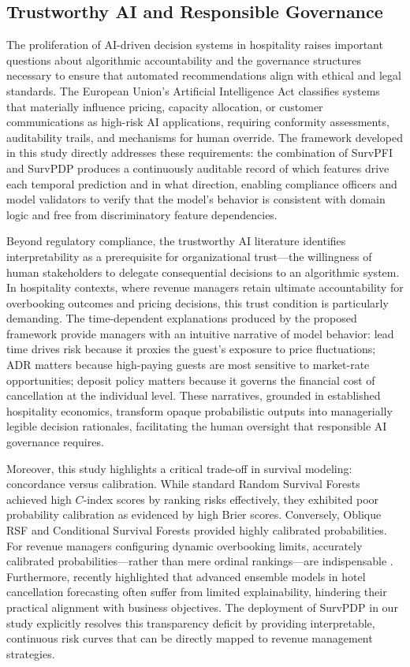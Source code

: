 \documentclass[pdflatex,sn-mathphys-ay]{sn-jnl}
\theoremstyle{thmstyleone}%
\theoremstyle{thmstyletwo}%
\theoremstyle{thmstylethree}%
\begin{document}
\subsection{Trustworthy AI and Responsible Governance}

The proliferation of AI-driven decision systems in hospitality raises important questions about algorithmic accountability and the governance structures necessary to ensure that automated recommendations align with ethical and legal standards. The European Union's Artificial Intelligence Act classifies systems that materially influence pricing, capacity allocation, or customer communications as high-risk AI applications, requiring conformity assessments, auditability trails, and mechanisms for human override. The framework developed in this study directly addresses these requirements: the combination of SurvPFI and SurvPDP produces a continuously auditable record of which features drive each temporal prediction and in what direction, enabling compliance officers and model validators to verify that the model's behavior is consistent with domain logic and free from discriminatory feature dependencies.

Beyond regulatory compliance, the trustworthy AI literature \citep{thiebes2021trustworthy} identifies interpretability as a prerequisite for organizational trust—the willingness of human stakeholders to delegate consequential decisions to an algorithmic system. In hospitality contexts, where revenue managers retain ultimate accountability for overbooking outcomes and pricing decisions, this trust condition is particularly demanding. The time-dependent explanations produced by the proposed framework provide managers with an intuitive narrative of model behavior: lead time drives risk because it proxies the guest's exposure to price fluctuations; ADR matters because high-paying guests are most sensitive to market-rate opportunities; deposit policy matters because it governs the financial cost of cancellation at the individual level. These narratives, grounded in established hospitality economics, transform opaque probabilistic outputs into managerially legible decision rationales, facilitating the human oversight that responsible AI governance requires.

Moreover, this study highlights a critical trade-off in survival modeling: concordance versus calibration. While standard Random Survival Forests achieved high $C$-index scores by ranking risks effectively, they exhibited poor probability calibration as evidenced by high Brier scores. Conversely, Oblique RSF and Conditional Survival Forests provided highly calibrated probabilities. For revenue managers configuring dynamic overbooking limits, accurately calibrated probabilities—rather than mere ordinal rankings—are indispensable \citep{ampountolas2025predicting}. Furthermore, \cite{liu2025explainable} recently highlighted that advanced ensemble models in hotel cancellation forecasting often suffer from limited explainability, hindering their practical alignment with business objectives. The deployment of SurvPDP in our study explicitly resolves this transparency deficit by providing interpretable, continuous risk curves that can be directly mapped to revenue management strategies.
\end{document}
